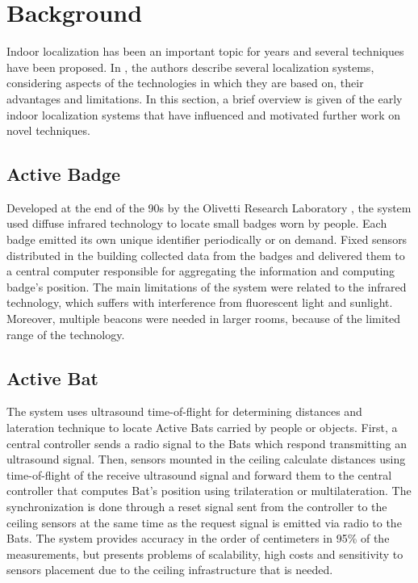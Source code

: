 \section{Background}

Indoor localization has been an important topic for years and several techniques have been proposed. In \cite{locSysUbiComp}, the authors describe several localization systems, considering aspects of the technologies in which they are based on, their advantages and limitations. In this section, a brief overview is given of the early indoor localization systems that have influenced and motivated further work on novel techniques.

\subsection{Active Badge}
Developed at the end of the 90s by the Olivetti Research Laboratory \cite{activeBadge}, the system used diffuse infrared technology to locate small badges worn by people. Each badge emitted its own unique identifier periodically or on demand. Fixed sensors distributed in the building collected data from the badges and delivered them to a central computer responsible for aggregating the information and computing badge's position. The main limitations of the system were related to the infrared technology, which suffers with interference from fluorescent light and sunlight. Moreover, multiple beacons were needed in larger rooms, because of the limited range of the technology.

\subsection{Active Bat}
The system uses ultrasound time-of-flight for determining distances and lateration technique to locate Active Bats carried by people or objects. First, a central controller sends a radio signal to the Bats which respond transmitting an ultrasound signal. Then, sensors mounted in the ceiling calculate distances using time-of-flight of the receive ultrasound signal and forward them to the central controller that computes Bat's position using trilateration or multilateration. The synchronization is done through a reset signal sent from the controller to the ceiling sensors at the same time as the request signal is emitted via radio to the Bats. The system provides accuracy in the order of centimeters in 95\% of the measurements, but presents problems of scalability, high costs and sensitivity to sensors placement due to the ceiling infrastructure that is needed.

